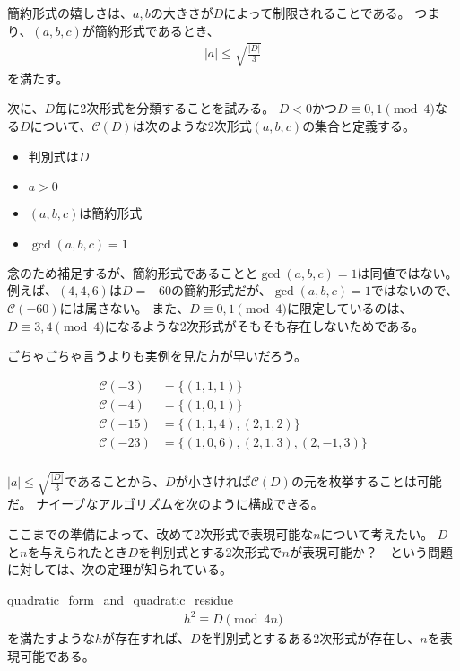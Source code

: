 
簡約形式の嬉しさは、$a,b$の大きさが$D$によって制限されることである。
つまり、$(a,b,c)$が簡約形式であるとき、
\begin{align*}
|a| \le \sqrt{\frac{|D|}{3}}
\end{align*}
を満たす。

次に、$D$毎に2次形式を分類することを試みる。
$D<0$かつ$D\equiv0,1\pmod{4}$なる$D$について、$\mathcal{C}(D)$は次のような2次形式$(a,b,c)$の集合と定義する。
\begin{itemize}
 \item 判別式は$D$
 \item $a>0$
 \item $(a,b,c)$は簡約形式
 \item $\gcd(a,b,c)=1$
\end{itemize}

念のため補足するが、簡約形式であることと$\gcd(a,b,c)=1$は同値ではない。
例えば、$(4,4,6)$は$D=-60$の簡約形式だが、$\gcd(a,b,c)=1$ではないので、$\mathcal{C}(-60)$には属さない。
また、$D\equiv0,1\pmod{4}$に限定しているのは、$D\equiv3,4\pmod{4}$になるような2次形式がそもそも存在しないためである。

ごちゃごちゃ言うよりも実例を見た方が早いだろう。

\begin{align*}
\mathcal{C}(-3) &= \{(1,1,1)\}\\
\mathcal{C}(-4) &= \{(1,0,1)\}\\
\mathcal{C}(-15) &= \{(1,1,4), (2,1,2)\}\\
\mathcal{C}(-23) &= \{(1,0,6), (2,1,3), (2,-1,3)\}\\
\end{align*}

$|a| \le \sqrt{\frac{|D|}{3}}$であることから、$D$が小さければ$\mathcal{C}(D)$の元を枚挙することは可能だ。
ナイーブなアルゴリズムを次のように構成できる。


ここまでの準備によって、改めて2次形式で表現可能な$n$について考えたい。
$D$と$n$を与えられたとき$D$を判別式とする2次形式で$n$が表現可能か？　という問題に対しては、次の定理が知られている。

\begin{Theo}{}{quadratic_form_and_quadratic_residue}
\begin{align*}
h^2 \equiv D \pmod{4n}
\end{align*}
を満たすような$h$が存在すれば、$D$を判別式とするある2次形式が存在し、$n$を表現可能である。
\end{Theo}

